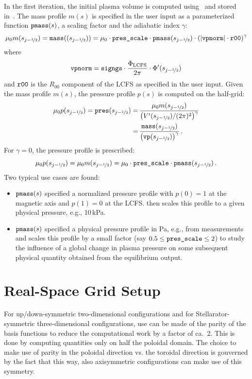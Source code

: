 In the first iteration, the initial plasma volume is computed using~ and stored in~.
The mass profile $m(s)$ is specified in the user input as a parameterized function $\texttt{pmass}(s)$,
a scaling factor  and the adiabatic index $\gamma$:
\begin{equation}
  \mu_0 m(s_{j-\nicefrac{1}{2}}) = \texttt{mass}((s_{j-\nicefrac{1}{2}}))
   = \mu_0 \cdot \texttt{pres\_scale} \cdot \texttt{pmass}(s_{j-\nicefrac{1}{2}}) \cdot \left( |\texttt{vpnorm}| \cdot \texttt{r00} \right)^\gamma
\end{equation}
where
\begin{equation}
  \texttt{vpnorm} = \texttt{signgs} \cdot \frac{\Phi_\mathrm{LCFS}}{2 \pi} \cdot \Phi'(s_{j-\nicefrac{1}{2}})
\end{equation}
and $\texttt{r00}$ is the $R_{00}$ component of the LCFS as specified in the user input.
Given the mass profile $m(s)$, the pressure profile $p(s)$ is computed on the half-grid:
\begin{align}
  \mu_0 p(s_{j-\nicefrac{1}{2}}) = \texttt{pres}(s_{j-\nicefrac{1}{2}})
   =&\, \frac{\mu_0 m(s_{j-\nicefrac{1}{2}})}{\left( V'(s_{j-\nicefrac{1}{2}}) / (2 \pi)^2 \right)^\gamma} \nonumber \\
   =&\, \frac{\texttt{mass}(s_{j-\nicefrac{1}{2}})}{\left(\texttt{vp}(s_{j-\nicefrac{1}{2}})\right)^\gamma} \, .
\end{align}
For $\gamma = 0$, the pressure profile is prescribed:
\begin{equation}
  \mu_0 p(s_{j-\nicefrac{1}{2}}) = \mu_0 m(s_{j-\nicefrac{1}{2}}) = \mu_0 \cdot \texttt{pres\_scale} \cdot \texttt{pmass}(s_{j-\nicefrac{1}{2}}) \, .
\end{equation}
Two typical use cases are found:
\begin{itemize}
  \item $\texttt{pmass}(s)$ specified a normalized pressure profile with $p(0) = 1$ at the magnetic axis and $p(1) = 0$ at the LCFS.
         then scales this profile to a given physical pressure, e.g., 10\,kPa.
  \item $\texttt{pmass}(s)$ specified a physical pressure profile in Pa, e.g., from measurements and
         scales this profile by a small factor (say $0.5 \leq \texttt{pres\_scale} \leq 2$)
        to study the influence of a global change in plasma pressure on some subsequent physical quantity
        obtained from the equilibrium output.
\end{itemize}

\FloatBarrier
\section{Real-Space Grid Setup}
For up/down-symmetric two-dimensional configurations
and for Stellarator-symmetric three-dimensional configurations,
use can be made of the parity of the basis functions
to reduce the computational work by a factor of ca.~2.
This is done by computing quantities only on half the poloidal domain.
The choice to make use of parity in the poloidal direction
vs. the toroidal direction is gouverned by the fact
that this way, also axisymmetric configurations can make use of this symmetry.

